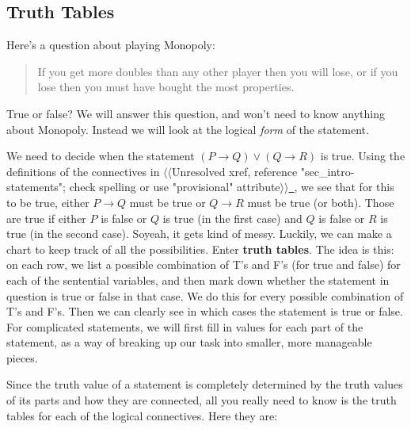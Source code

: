 \documentclass[10pt,]{book}
\newcommand{\terminology}[1]{\textbf{#1}}
\theoremstyle{plain}
\theoremstyle{definition}
\theoremstyle{definition}
\theoremstyle{definition}
\theoremstyle{definition}
\numberwithin{equation}{chapter}
\def\imp{\rightarrow}
\begin{document}
\subsection[{Truth Tables}]{Truth Tables}\label{subsection-35}
\hypertarget{p-1787}{}%
Here's a question about playing Monopoly:%
\begin{quote}\hypertarget{blockquote-10}{}
\hypertarget{p-1788}{}%
If you get more doubles than any other player then you will lose, or if you lose then you must have bought the most properties.%
\end{quote}
\hypertarget{p-1789}{}%
True or false? We will answer this question, and won't need to know anything about Monopoly. Instead we will look at the logical \emph{form} of the statement.%
\par
\hypertarget{p-1790}{}%
We need to decide when the statement \((P \imp Q) \vee (Q \imp R)\) is true. Using the definitions of the connectives in {$\langle\langle$Unresolved xref, reference "sec\_intro-statements"; check spelling or use "provisional" attribute$\rangle\rangle$}\hyperlink{}{~}, we see that for this to be true, either \(P \imp Q\) must be true or \(Q \imp R\) must be true (or both). Those are true if either \(P\) is false or \(Q\) is true (in the first case) and \(Q\) is false or \(R\) is true (in the second case). So\textemdash{}yeah, it gets kind of messy. Luckily, we can make a chart to keep track of all the possibilities. Enter \terminology{truth tables}. The idea is this: on each row, we list a possible combination of T's and F's (for true and false) for each of the sentential variables, and then mark down whether the statement in question is true or false in that case. We do this for every possible combination of T's and F's. Then we can clearly see in which cases the statement is true or false. For complicated statements, we will first fill in values for each part of the statement, as a way of breaking up our task into smaller, more manageable pieces.%
\par
\hypertarget{p-1791}{}%
Since the truth value of a statement is completely determined by the truth values of its parts and how they are connected, all you really need to know is the truth tables for each of the logical connectives. Here they are:%
\end{document}
